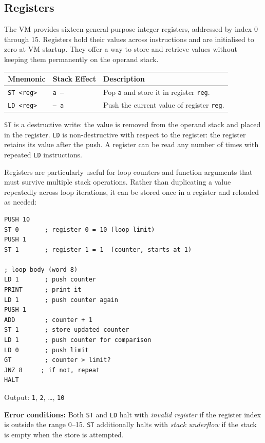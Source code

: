 \subsection{Registers}

The VM provides sixteen general-purpose integer registers, addressed by index 0 through 15. Registers hold their values across instructions and are initialised to zero at VM startup. They offer a way to store and retrieve values without keeping them permanently on the operand stack.

\begin{center}
\begin{tabular}{lll}
\toprule
\textbf{Mnemonic} & \textbf{Stack Effect} & \textbf{Description} \\
\midrule
\texttt{ST <reg>} & \texttt{a --}  & Pop \texttt{a} and store it in register \texttt{reg}. \\
\texttt{LD <reg>} & \texttt{-- a}  & Push the current value of register \texttt{reg}. \\
\bottomrule
\end{tabular}
\end{center}

\texttt{ST} is a destructive write: the value is removed from the operand stack and placed in the register. \texttt{LD} is non-destructive with respect to the register: the register retains its value after the push. A register can be read any number of times with repeated \texttt{LD} instructions.

Registers are particularly useful for loop counters and function arguments that must survive multiple stack operations. Rather than duplicating a value repeatedly across loop iterations, it can be stored once in a register and reloaded as needed:

\begin{lstlisting}
PUSH 10
ST 0       ; register 0 = 10 (loop limit)
PUSH 1
ST 1       ; register 1 = 1  (counter, starts at 1)

; loop body (word 8)
LD 1       ; push counter
PRINT      ; print it
LD 1       ; push counter again
PUSH 1
ADD        ; counter + 1
ST 1       ; store updated counter
LD 1       ; push counter for comparison
LD 0       ; push limit
GT         ; counter > limit?
JNZ 8     ; if not, repeat
HALT
\end{lstlisting}

Output: \texttt{1}, \texttt{2}, \ldots, \texttt{10}

\textbf{Error conditions:} Both \texttt{ST} and \texttt{LD} halt with \textit{invalid register} if the register index is outside the range 0--15. \texttt{ST} additionally halts with \textit{stack underflow} if the stack is empty when the store is attempted.

